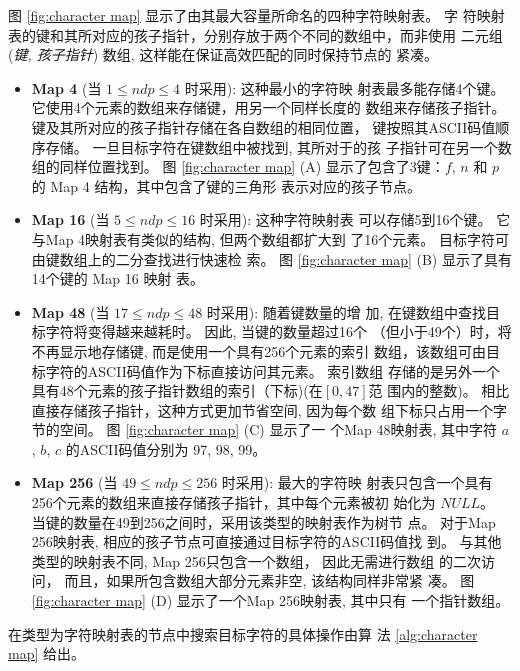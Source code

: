 图 \ref{fig:character map} 显示了由其最大容量所命名的四种字符映射表。 字
符映射表的键和其所对应的孩子指针，分别存放于两个不同的数组中，而非使用
二元组 (\emph{键, 孩子指针}) 数组, 这样能在保证高效匹配的同时保持节点的
紧凑。

\begin{itemize}
\item \textbf{Map 4} (当 $1 \leq ndp \leq 4$ 时采用): 这种最小的字符映
  射表最多能存储4个键。 它使用4个元素的数组来存储键，用另一个同样长度的
  数组来存储孩子指针。 键及其所对应的孩子指针存储在各自数组的相同位置，
  键按照其ASCII码值顺序存储。 一旦目标字符在键数组中被找到, 其所对于的孩
  子指针可在另一个数组的同样位置找到。  图 \ref{fig:character map} (A)
  显示了包含了3键：$f$, $n$ 和 $p$ 的 Map 4 结构，其中包含了键的三角形
  表示对应的孩子节点。

\item \textbf{Map 16} (当 $5 \leq ndp \leq 16$ 时采用): 这种字符映射表
  可以存储5到16个键。 它与Map 4映射表有类似的结构, 但两个数组都扩大到
  了16个元素。 目标字符可由键数组上的二分查找进行快速检
  索。 图 \ref{fig:character map} (B) 显示了具有14个键的 Map 16 映射
  表。


\item \textbf{Map 48} (当 $17 \leq ndp \leq 48$ 时采用): 随着键数量的增
  加, 在键数组中查找目标字符将变得越来越耗时。 因此, 当键的数量超过16个
  （但小于49个）时，将不再显示地存储键, 而是使用一个具有256个元素的索引
  数组，该数组可由目标字符的ASCII码值作为下标直接访问其元素。 索引数组
  存储的是另外一个具有48个元素的孩子指针数组的索引（下标)(在$[0,47]$范
  围内的整数)。 相比直接存储孩子指针，这种方式更加节省空间, 因为每个数
  组下标只占用一个字节的空间。 图 \ref{fig:character map} (C) 显示了一
  个Map 48映射表, 其中字符 $a$, $b$, $c$ 的ASCII码值分别为 97, 98, 99。

\item \textbf{Map 256} (当 $49 \leq ndp \leq 256$ 时采用): 最大的字符映
  射表只包含一个具有256个元素的数组来直接存储孩子指针，其中每个元素被初
  始化为 $NULL$。 当键的数量在49到256之间时，采用该类型的映射表作为树节
  点。 对于Map 256映射表, 相应的孩子节点可直接通过目标字符的ASCII码值找
  到。 与其他类型的映射表不同, Map 256只包含一个数组， 因此无需进行数组
  的二次访问， 而且，如果所包含数组大部分元素非空, 该结构同样非常紧
  凑。 图 \ref{fig:character map} (D) 显示了一个Map 256映射表, 其中只有
  一个指针数组。
\end{itemize}

在类型为字符映射表的节点中搜索目标字符的具体操作由算
法 \ref{alg:character map} 给出。

